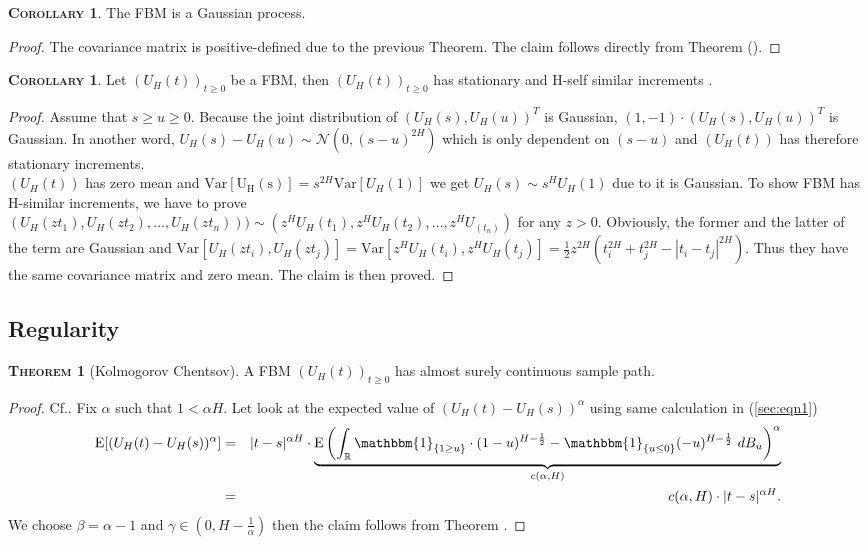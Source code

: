 \documentclass[a4paper, twoside, 11pt]{article}
\theoremstyle{definition}
\newtheorem{theorem}[definition]{\scshape Theorem}
\newtheorem{corollary}[definition]{\scshape Corollary}
\newcommand{\brkt}[1]{\left({#1} \right)}
\begin{document}
\begin{corollary}
  The FBM is a Gaussian process.
\end{corollary}

\begin{proof}
The covariance matrix is positive-defined due to the previous Theorem. The claim follows directly from Theorem ().
\end{proof}

\begin{corollary}
  Let $(U_H(t))_{t\ge 0}$ be a FBM, then $(U_H(t))_{t\ge 0}$ has stationary and H-self similar increments . 
\end{corollary}
\begin{proof}

 Assume that $s \ge u \ge 0 $. Because the joint distribution of $(U_H(s), U_H(u))^T$ is Gaussian, $(1, -1) \cdot (U_H(s), U_H(u))^T $ is Gaussian. In another word,  $U_H(s) - U_H(u) \sim \mathcal{N}(0, (s-u)^{2H})$ which is only dependent on $(s-u)$ and $(U_H(t))$ has therefore stationary increments.\\
   $(U_H(t))$ has zero mean and $\mathrm{Var[U_H(s)]} = s^{2H}\mathrm{Var}[U_H(1)]$ we get $U_H(s) \sim s^HU_H(1)$ due to it is Gaussian.
   To show FBM has H-similar increments, we have to prove\\ $(U_H(zt_1), U_H(zt_2),\dots, U_H(zt_n))) \sim (z^HU_H(t_1), z^HU_H(t_2),\dots, z^HU_(t_n))$ for any $z > 0$. Obviously, the former and the latter of the term are Gaussian and $\mathrm{Var}[U_H(zt_i), U_H(zt_j)] = \mathrm{Var}[z^HU_H(t_i), z^HU_H(t_j)] = \frac{1}{2}z^{2H}(t_i^{2H} + t_j^{2H} - |t_i-t_j|^{2H})$. Thus they have the same covariance matrix and zero mean. The claim is then proved.
\end{proof}

\subsection{Regularity}
\begin{theorem}[Kolmogorov Chentsov]
  A FBM $(U_H(t))_{t\ge 0}$ has almost surely continuous sample path.  
\end{theorem}

\begin{proof}
  Cf.\cite{mandelbrot}. Fix $\alpha$ such that $1 < \alpha H$. Let look at the expected value of $(U_H(t) - U_H(s))^\alpha$ using same calculation in (\ref{sec:eqn1})
  \begin{eqnarray}
	\mathrm{E} [(U_H(t) - U_H(s))^\alpha] &=& |t-s|^{\alpha H} \cdot \underbrace{\mathrm{E}\brkt{\int_{\mathbb{R}} \mathbbm{1}_{\{1\ge u\}}\cdot (1-u)^{H-\frac{1}{2}} - \mathbbm{1}_{\{u\le 0\}} (-u)^{H-\frac{1}{2}} \, \mathop{dB_u}}^\alpha}_{c(\alpha,H)}\nonumber\\
	&=& c(\alpha,H) \cdot |t-s|^{\alpha H}.
	\label{sec:eqn5}
  \end{eqnarray}
  We choose $\beta = \alpha -1$ and $\gamma \in (0, H-\frac{1}{\alpha})$ then the claim follows from Theorem .
\end{proof}
\end{document}
